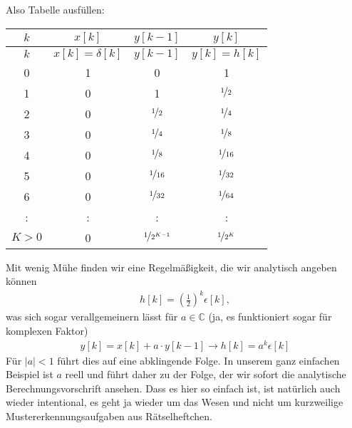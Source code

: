 \begin{Ansatz}
Also Tabelle ausfüllen:
\begin{center}
\begin{tabular}{||c | c | c | c||}
\hline
$k$ & $x[k]$ & $y[k-1]$ & $y[k]$ \\
\hline\hline
$k$ & $x[k]=\delta[k]$ & $y[k-1]$ & $y[k] = h[k]$ \\
\hline
0 & 1 & 0 & 1  \\\hline
1 & 0 & 1  & $\nicefrac{1}{2}$ \\\hline
2 & 0 & $\nicefrac{1}{2}$ & $\nicefrac{1}{4}$ \\\hline
3 & 0 & $\nicefrac{1}{4}$ & $\nicefrac{1}{8}$ \\\hline
4 & 0 & $\nicefrac{1}{8}$ & $\nicefrac{1}{16}$ \\\hline
5 & 0 & $\nicefrac{1}{16}$ & $\nicefrac{1}{32}$ \\\hline
6 & 0 & $\nicefrac{1}{32}$ & $\nicefrac{1}{64}$ \\\hline
: & : & : & : \\\hline
$K > 0$ & 0 & $\nicefrac{1}{2^{K-1}}$ & $\nicefrac{1}{2^K}$ \\\hline
\end{tabular}
\end{center}
Mit wenig Mühe finden wir eine Regelmäßigkeit, die wir analytisch angeben können
\begin{align}
h[k] = (\frac{1}{2})^k \epsilon[k],
\end{align}
was sich sogar verallgemeinern lässt für $a\in\mathbb{C}$ (ja, es funktioniert sogar
für komplexen Faktor)
\begin{align}
y[k] = x[k] + a \cdot y[k-1] \rightarrow h[k] = a^k \epsilon[k]
\end{align}
Für $|a|<1$ führt dies auf eine abklingende Folge. In unserem ganz einfachen
Beispiel ist $a$ reell und führt daher zu der Folge, der wir sofort die
analytische Berechnungsvorschrift ansehen. Dass es hier so einfach ist, ist
natürlich auch wieder intentional, es geht ja wieder um das Wesen und nicht um
kurzweilige Mustererkennungsaufgaben aus Rätselheftchen.


\end{Ansatz}
